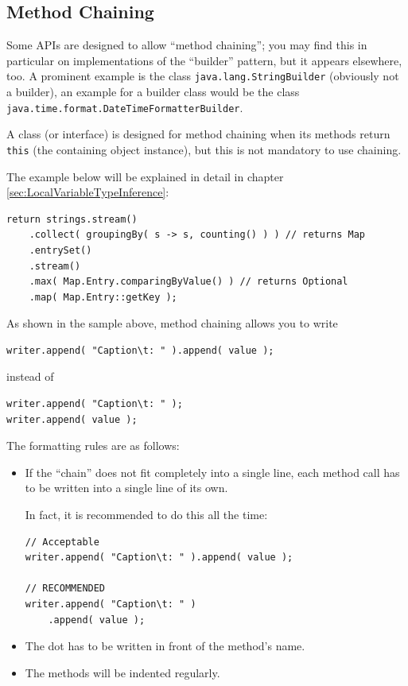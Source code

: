 \documentclass[11pt,a4paper, titlepage, parskip=half, headsepline, footsepline, cleardoublepage=current, headheight=1cm]{scrbook}
\newcommand*{\tqref}[1]{\hyperref[{#1}]{\ref*{#1}}}
\begin{document}
\subsection{Method Chaining}
Some APIs are designed to allow “method chaining”; you may find this in particular on implementations of the “builder” pattern, but it appears elsewhere, too. A prominent example is the class \lstinline|java.lang.StringBuilder|\autocite{ORACLE_DOC_STRINGBUILDER_CLASS} (obviously not a builder), an example for a builder class would be the class \lstinline|java.time.format.DateTimeFormatterBuilder|\autocite{ORACLE_DOC_DATETIMEFORMATTERBUILDER_CLASS}.

A class (or interface) is designed for method chaining when its methods return \lstinline|this| (the containing object instance), but this is not mandatory to use chaining.

The example below will be explained in detail in chapter \tqref{sec:LocalVariableTypeInference}:
\begin{lstlisting}
return strings.stream()
    .collect( groupingBy( s -> s, counting() ) ) // returns Map
    .entrySet() 
    .stream()
    .max( Map.Entry.comparingByValue() ) // returns Optional
    .map( Map.Entry::getKey );
\end{lstlisting}

As shown in the sample above, method chaining allows you to write

\begin{lstlisting}
writer.append( "Caption\t: " ).append( value );
\end{lstlisting}

instead of

\begin{lstlisting}
writer.append( "Caption\t: " );
writer.append( value );
\end{lstlisting}

The formatting rules are as follows:
\begin{itemize}
\item{If the “chain” does not fit completely into a single line, each method call has to be written into a single line of its own.

In fact, it is recommended to do this all the time:
\begin{lstlisting}
// Acceptable
writer.append( "Caption\t: " ).append( value );

// RECOMMENDED
writer.append( "Caption\t: " )
    .append( value );
\end{lstlisting}}

\item{The dot has to be written in front of the method's name.}

\item{The methods will be indented regularly.}
\end{itemize}
\end{document}
